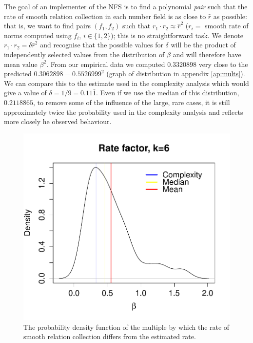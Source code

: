 \documentclass[a4paper, 12pt, envcountsect, runningheads]{llncs}
\numberwithin{figure}{section}
\numberwithin{equation}{section}
\begin{document}
The goal of an implementer of the NFS is to find a polynomial {\em pair} such that the rate of smooth relation collection in each number field is as close to $\hat{r}$ as possible: that is, we want to find pairs $(f_1,f_2)$ such that $r_1\cdot r_2\approx\hat{r}^2$ ($r_i=$ smooth rate of norms computed using $f_i$, $i\in\{1,2\}$); this is no straightforward task. We denote $r_1\cdot r_2=\delta\hat{r}^2$ and recognise that the possible values for $\delta$ will be the product of independently selected values from the distribution of $\beta$ and will therefore have mean value $\beta^2$. From our empirical data we computed $0.3320898$ very close to the predicted $0.3062898=0.5526999^2$ (graph of distribution in appendix \ref{ap:mults}). We can compare this to the estimate used in the complexity analysis which would give a value of $\delta=1/9=0.11\bar{1}$. Even if we use the median of this distribution, $0.2118865$, to remove some of the influence of the large, rare cases, it is still approximately twice the probability used in the complexity analysis and reflects more closely he observed behaviour.
\begin{figure}\label{fig:mults}
\includegraphics[scale=0.7]{graphs/multiple_tests_plot}\caption{The probability density function of the multiple by which the rate of smooth relation collection differs from the estimated rate.}
\end{figure}
\end{document}
